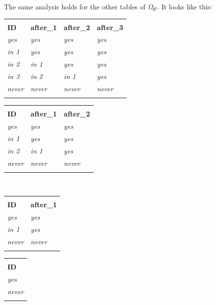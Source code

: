 \documentclass[../main/CT4S-EN-RU]{subfiles}
\begin{document}
\begin{exampleENG}
The same analysis holds for the other tables of $\Omega_{𝓒}.$ It looks like this:
\begin{center}
\begin{tabular}{| l || l | l | l |}
\bhline
\multicolumn{4}{|c|}{$\Omega_{𝓒}({\tt 0})$}\\\bhline
{\bf ID}&{\bf after\_1}&{\bf after\_2}&{\bf after\_3}\\\bbhline
{\it yes}&{\it yes}&{\it yes}&{\it yes}\\\hline
{\it in 1}&{\it yes}&{\it yes}&{\it yes}\\\hline
{\it in 2}&{\it in 1}&{\it yes}&{\it yes}\\\hline
{\it in 3}&{\it in 2}&{\it in 1}&{\it yes}\\\hline
{\it never}&{\it never}&{\it never}&{\it never}\\\bhline
\end{tabular}
\hsp
\begin{tabular}{| l || l | l |}
\bhline
\multicolumn{3}{|c|}{$\Omega_{𝓒}({\tt 1})$}\\\bhline
{\bf ID}&{\bf after\_1}&{\bf after\_2}\\\bbhline
{\it yes}&{\it yes}&{\it yes}\\\hline
{\it in 1}&{\it yes}&{\it yes}\\\hline
{\it in 2}&{\it in 1}&{\it yes}\\\hline
{\it never}&{\it never}&{\it never}\\\bhline
\end{tabular}\\\vspace{.2in}
\begin{tabular}{| l || l |}
\bhline
\multicolumn{2}{|c|}{$\Omega_{𝓒}({\tt 2})$}\\\bhline
{\bf ID}&{\bf after\_1}\\\bbhline
{\it yes}&{\it yes}\\\hline
{\it in 1}&{\it yes}\\\hline
{\it never}&{\it never}\\\bhline
\end{tabular}
\hsp
\begin{tabular}{| l ||}
\bhline
\multicolumn{1}{|c|}{$\Omega_{𝓒}({\tt 3})$}\\\bhline
{\bf ID}\\\bbhline
{\it yes}\\\hline
{\it never}\\\bhline
\end{tabular}


\end{center}
\end{exampleENG}
\end{document}
